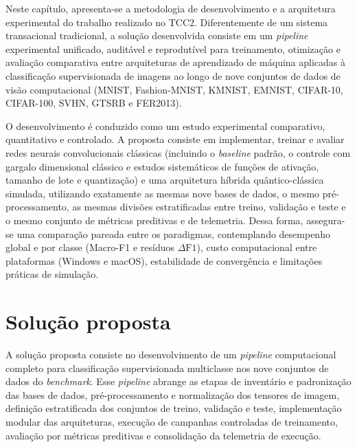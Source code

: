 \documentclass[
    12pt,
    openright,
    oneside,
    a4paper,
    english,
    brazil
]{abntex2}
\begin{document}
Neste capítulo, apresenta-se a metodologia de desenvolvimento e a arquitetura experimental do trabalho realizado no TCC2. Diferentemente de um sistema transacional tradicional, a solução desenvolvida consiste em um \textit{pipeline} experimental unificado, auditável e reprodutível para treinamento, otimização e avaliação comparativa entre arquiteturas de aprendizado de máquina aplicadas à classificação supervisionada de imagens ao longo de nove conjuntos de dados de visão computacional (MNIST, Fashion-MNIST, KMNIST, EMNIST, CIFAR-10, CIFAR-100, SVHN, GTSRB e FER2013).

O desenvolvimento é conduzido como um estudo experimental comparativo, quantitativo e controlado. A proposta consiste em implementar, treinar e avaliar redes neurais convolucionais clássicas (incluindo o \textit{baseline} padrão, o controle com gargalo dimensional clássico e estudos sistemáticos de funções de ativação, tamanho de lote e quantização) e uma arquitetura híbrida quântico-clássica simulada, utilizando exatamente as mesmas nove bases de dados, o mesmo pré-processamento, as mesmas divisões estratificadas entre treino, validação e teste e o mesmo conjunto de métricas preditivas e de telemetria. Dessa forma, assegura-se uma comparação pareada entre os paradigmas, contemplando desempenho global e por classe (Macro-F1 e resíduos \(\Delta\text{F1}\)), custo computacional entre plataformas (Windows e macOS), estabilidade de convergência e limitações práticas de simulação.

\section{Solução proposta}
\label{sec:solucao}

A solução proposta consiste no desenvolvimento de um \textit{pipeline} computacional completo para classificação supervisionada multiclasse nos nove conjuntos de dados do \textit{benchmark}. Esse \textit{pipeline} abrange as etapas de inventário e padronização das bases de dados, pré-processamento e normalização dos tensores de imagem, definição estratificada dos conjuntos de treino, validação e teste, implementação modular das arquiteturas, execução de campanhas controladas de treinamento, avaliação por métricas preditivas e consolidação da telemetria de execução.
\end{document}
